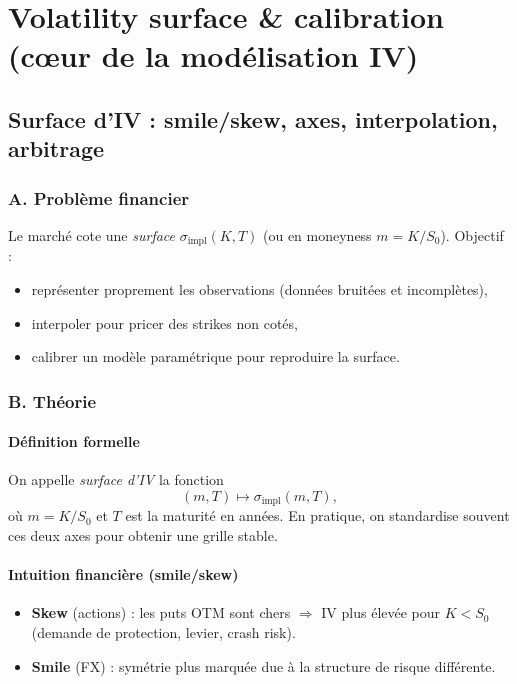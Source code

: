 \documentclass[11pt,a4paper]{report}
\theoremstyle{definition}
\theoremstyle{plain}
\theoremstyle{remark}
\newcommand{\1}{\mathbf{1}}
\begin{document}
\part{Volatility surface \& calibration (c\oe{}ur de la modélisation IV)}

\chapter{Surface d'IV : smile/skew, axes, interpolation, arbitrage}

\section{A. Problème financier}
Le marché cote une \emph{surface} $\sigma_{\text{impl}}(K,T)$ (ou en moneyness $m=K/S_0$). Objectif :
\begin{itemize}[leftmargin=*]
\item représenter proprement les observations (données bruitées et incomplètes),
\item interpoler pour pricer des strikes non cotés,
\item calibrer un modèle paramétrique pour reproduire la surface.
\end{itemize}

\section{B. Théorie}
\subsection*{Définition formelle}
On appelle \emph{surface d'IV} la fonction
\[
(m,T)\mapsto \sigma_{\text{impl}}(m,T),
\]
où $m=K/S_0$ et $T$ est la maturité en années. En pratique, on standardise souvent ces deux axes pour obtenir une grille stable.

\subsection*{Intuition financière (smile/skew)}
\begin{itemize}[leftmargin=*]
\item \textbf{Skew} (actions) : les puts OTM sont chers $\Rightarrow$ IV plus élevée pour $K<S_0$ (demande de protection, levier, crash risk).
\item \textbf{Smile} (FX) : symétrie plus marquée due à la structure de risque différente.
\end{itemize}
\end{document}
